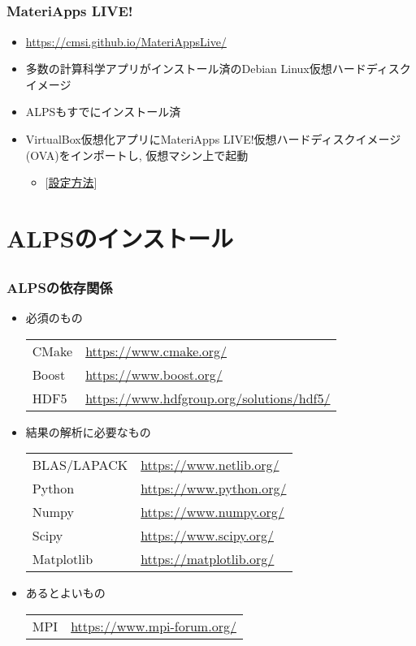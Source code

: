 \subsection*{\redb\whiteb\greenb}
\begin{frame}
 \frametitle{MateriApps LIVE!}
 \begin{itemize}
   \item \url{https://cmsi.github.io/MateriAppsLive/}
   \item 多数の計算科学アプリがインストール済のDebian Linux仮想ハードディスクイメージ
   \item ALPSもすでにインストール済
   \item VirtualBox仮想化アプリにMateriApps LIVE!仮想ハードディスクイメージ(OVA)をインポートし, 仮想マシン上で起動
     \begin{itemize}
     \item \mbox{} [\href{https://www.slideshare.net/cms_initiative/clipboards/how-to-setup-materiapps-live}{設定方法}]
     \end{itemize}
 \end{itemize}
\end{frame}

\section{ALPSのインストール}

\subsection*{\redm\whitem\greenb}
\begin{frame}
  \frametitle{ALPSの依存関係}
  \begin{itemize}
  \item 必須のもの\\
    \begin{tabular}{ll}
      CMake & \url{https://www.cmake.org/} \\
      Boost & \url{https://www.boost.org/} \\
      HDF5  & \url{https://www.hdfgroup.org/solutions/hdf5/} \\
    \end{tabular}
  \item 結果の解析に必要なもの \\
    \begin{tabular}{ll}
      BLAS/LAPACK & \url{https://www.netlib.org/} \\
      Python & \url{https://www.python.org/} \\
      Numpy & \url{https://www.numpy.org/} \\
      Scipy & \url{https://www.scipy.org/} \\
      Matplotlib & \url{https://matplotlib.org/}
    \end{tabular}
  \item あるとよいもの \\
    \begin{tabular}{ll}
      MPI & \url{https://www.mpi-forum.org/} \\
    \end{tabular}
  \end{itemize}
\end{frame}

